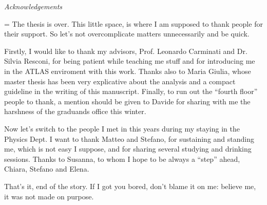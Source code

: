 \thispagestyle{empty}
\vspace*{\fill}
\centerline{\LARGE\itshape Acknowledgements}
\nobreak
\vspace{1pc}
\begingroup\small
{}\textwidth
\rightskip=\leftskip
The thesis is over. This little space, is where I am supposed to thank people for their support. So let's not overcomplicate matters unnecessarily and be quick. 

Firstly, I would like to thank my advisors, Prof. Leonardo Carminati and Dr. Silvia Resconi, for being patient while teaching me stuff and for introducing me in the ATLAS enviroment with this work. Thanks also to Maria Giulia, whose master thesis has been very explicative about the \mph analysis and a compact guideline in the writing of this manuscript. Finally, to run out the ``fourth floor'' people to thank, a mention should be given to Davide for sharing with me the harshness of the graduands office this winter.

Now let's switch to the people I met in this years during my staying in the Physics Dept. I want to thank Matteo and Stefano, for sustaining and standing me, which is not easy I suppose, and for sharing several studying and drinking sessions. Thanks to Susanna, to whom I hope to be always a ``step'' ahead, Chiara, Stefano and Elena.


That's it, end of the story. If I got you bored, don't blame it on me: believe me, it was not made on purpose.
\par\endgroup
\vspace{\fill}
\clearpage
\thispagestyle{empty}



